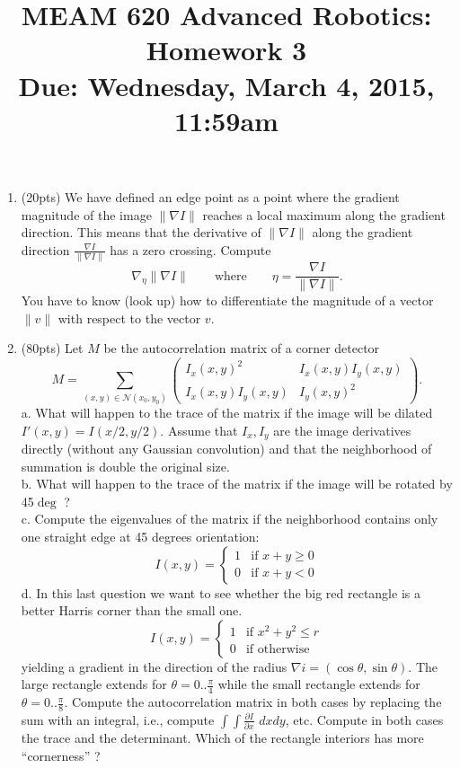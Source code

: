 \documentclass[11pt,english]{article}
\title{MEAM 620 Advanced Robotics: Homework 3\\
Due: Wednesday, March 4, 2015,  11:59am }
\author{}
\date{}
\begin{document}
\maketitle
\begin{enumerate}
\item
(20pts) We have defined an edge point as a point where the gradient magnitude of the image $\| \nabla I \| $ reaches a local maximum along the gradient direction. This means that the derivative of $\| \nabla I \| $ along the gradient direction $\frac{\nabla I}{\| \nabla I \|}$ has a zero crossing. Compute 
\[
\nabla_\eta \| \nabla I \|
\qquad \mbox{where} \qquad  \eta = \frac{\nabla I}{\| \nabla I \|} .
\]
 You have to know (look up) how to differentiate the magnitude of a vector $\| v \|$ with respect to the vector $v$. 

\item
(80pts)
Let $M$ be the autocorrelation matrix of a corner detector 
\[
M = \sum_{(x,y)\in \mathcal{N}(x_0,y_0)}  \begin{pmatrix}
I_x(x,y)^2 & I_x(x,y) I_y(x,y) \\ I_x(x,y) I_y(x,y) & I_y(x,y)^2\end{pmatrix}  .
\]
a. What will happen to the trace of the matrix if the image will be dilated $I'(x,y) = I(x/2,y/2)$.
Assume that $I_x,I_y$ are the image derivatives directly (without any Gaussian convolution) and that the neighborhood of summation is double the original size. 
\\
b. What will happen to the trace of the matrix if the image will be rotated by 45$\deg$ ?
\\
c. Compute the eigenvalues of the matrix if the neighborhood contains only one straight edge at 45 degrees orientation:
\[
I(x,y) = \left\{
	\begin{array}{ll}
		1  & \mbox{if } x+y \geq 0 \\
		0 & \mbox{if } x+y < 0
	\end{array}
\right.
\]
d. In this last question we want to see whether the big red rectangle is a better Harris corner than the small one. 
\[
I(x,y) = \left\{
	\begin{array}{ll}
		1  & \mbox{if } x^2+y^2  \leq r\\
		0 & \mbox{if } \mbox{otherwise}
	\end{array}
\right.
\]
yielding a  gradient in the direction of the radius $\nabla i = (\cos\theta,\sin\theta)$.
The large rectangle extends for $\theta=0..\frac{\pi}{4}$ while the small rectangle extends for  $\theta=0..\frac{\pi}{8}$. Compute the autocorrelation matrix in both cases by replacing the sum with an integral, i.e., compute $\int\int \frac{\partial{I}}{\partial{x}}\,\,dxdy$, etc. Compute in both cases the trace and the determinant. Which of the rectangle interiors has more ``cornerness'' ?



\end{enumerate}
\end{document}
